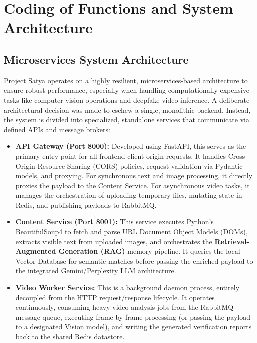\chapter{Coding of Functions and System Architecture}

\section{Microservices System Architecture}
Project Satya operates on a highly resilient, microservices-based architecture to ensure robust performance, especially when handling computationally expensive tasks like computer vision operations and deepfake video inference. A deliberate architectural decision was made to eschew a single, monolithic backend. Instead, the system is divided into specialized, standalone services that communicate via defined APIs and message brokers:

\begin{itemize}
    \item \textbf{API Gateway (Port 8000):} Developed using FastAPI, this serves as the primary entry point for all frontend client origin requests. It handles Cross-Origin Resource Sharing (CORS) policies, request validation via Pydantic models, and proxying. For synchronous text and image processing, it directly proxies the payload to the Content Service. For asynchronous video tasks, it manages the orchestration of uploading temporary files, mutating state in Redis, and publishing payloads to RabbitMQ.
    
    \item \textbf{Content Service (Port 8001):} This service executes Python's BeautifulSoup4 to fetch and parse URL Document Object Models (DOMs), extracts visible text from uploaded images, and orchestrates the \textbf{Retrieval-Augmented Generation (RAG)} memory pipeline. It queries the local Vector Database for semantic matches before passing the enriched payload to the integrated Gemini/Perplexity LLM architecture.
    
    \item \textbf{Video Worker Service:} This is a background daemon process, entirely decoupled from the HTTP request/response lifecycle. It operates continuously, consuming heavy video analysis jobs from the RabbitMQ message queue, executing frame-by-frame processing (or passing the payload to a designated Vision model), and writing the generated verification reports back to the shared Redis datastore.
\end{itemize}

